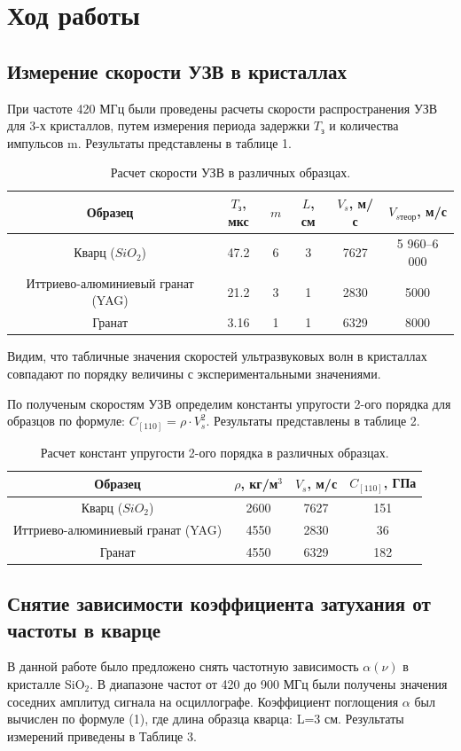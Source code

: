 \documentclass[a4paper, 12pt]{article}
\begin{document}
\section{Ход работы}
\subsection{Измерение скорости УЗВ в кристаллах}

При частоте 420 МГц были проведены расчеты скорости распространения УЗВ для 3-х кристаллов, путем измерения периода задержки $T_{\text{з}}$ и количества импульсов m. Результаты представлены в таблице 1.
\newpage
\begin{table}[h]
\centering
\begin{tabular}{|c|c|c|c|c|c|}
\hline
 Образец & $T_{\text{з}}$, мкс & $m$ & $L$, см & $V_{s}$, м/с & $V_{s\text{теор}}$, м/с \\ \hline
 Кварц ($SiO_2$) & 47.2  & 6 & 3 & 7627 & 5 960–6 000 \\ \hline
  Иттриево-алюминиевый гранат (YAG) & 21.2 & 3 &  1 & 2830 & 5000\\ \hline
 Гранат & 3.16  & 1 & 1 & 6329 & 8000\\ \hline
\end{tabular}
\label{tml}
\caption{Расчет скорости УЗВ в различных образцах.}
\end{table}

Видим, что табличные значения скоростей ультразвуковых волн в кристаллах совпадают по порядку величины с экспериментальными значениями.

По полученым скоростям УЗВ определим константы упругости 2-ого порядка для образцов по формуле: $C_{[110]}=\rho \cdot V_s^2$. Результаты представлены в таблице 2.

\begin{table}[h]
\centering
\begin{tabular}{|c|c|c|c|}
\hline
 Образец & $\rho$, кг/м$^3$  & $V_{s}$, м/с & $C_{[110]}$, ГПа \\ \hline
 Кварц ($SiO_2$) & 2600 & 7627 & 151 \\ \hline
  Иттриево-алюминиевый гранат (YAG) & 4550 & 2830 & 36\\ \hline
   Гранат & 4550  &  6329 & 182\\ \hline
\end{tabular}
\label{tml}
\caption{Расчет констант упругости 2-ого порядка в различных образцах.}
\end{table}

\subsection{Снятие зависимости коэффициента затухания от частоты в кварце}
В данной работе было предложено снять частотную зависимость $\alpha(\nu)$ в кристалле SiO$_2$. В диапазоне частот от 420 до 900 МГц были получены значения соседних амплитуд сигнала на осциллографе. Коэффициент поглощения $\alpha$ был вычислен по формуле (1), где длина образца кварца: L=3 см. Результаты измерений приведены в Таблице 3.
\end{document}
